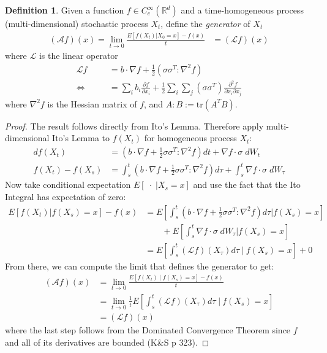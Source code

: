 \documentclass[12pt]{article}
\theoremstyle{plain}
\theoremstyle{definition}
\newtheorem{defn}[thm]{Definition}
\theoremstyle{remark}
\begin{document}
\begin{defn}
Given a function $f\in C_c^\infty(\mathbb{R}^d)$ and a time-homogeneous
process (multi-dimensional) stochastic process $X_t$, define the
\emph{generator} of $X_t$
\begin{align*}
  (\mathscr{A}f)(x)=
  \lim_{t\rightarrow0} \frac{E[f(X_t)|X_0=x]-f(x)}{t}
  &= (\mathscr{L}f)(x)
\end{align*}
where $\mathscr{L}$ is the linear operator
\begin{align*}
  \mathscr{L}f &= b \cdot \nabla f
  + \frac{1}{2} \left(\sigma \sigma^T:\nabla^2 f\right)\\
  \Leftrightarrow \qquad
  &= \sum_i b_i \frac{\partial f}{\partial x_i}
  + \frac{1}{2} \sum_i \sum_j \left(\sigma \sigma^T\right)
    \frac{\partial^2 f}{\partial x_i \partial x_j}
\end{align*}
where $\nabla^2 f$ is the Hessian matrix of $f$, and $A:B :=
\text{tr}(A^T B)$.
\end{defn}
\begin{proof}
The result follows directly from Ito's Lemma. Therefore apply
multi-dimensional Ito's Lemma to $f(X_t)$ for homogeneous process $X_t$:
\begin{align*}
  df(X_t) &=
  \left(b\cdot \nabla f + \frac{1}{2}\sigma\sigma^T : \nabla^2 f\right)
  dt
  + \nabla f\cdot \sigma \;dW_t\\
  f(X_t) - f(X_s) &=
  \int^t_s
  \left(b\cdot \nabla f + \frac{1}{2}\sigma\sigma^T : \nabla^2 f\right)
  d\tau
  +
  \int^t_s
  \nabla f\cdot \sigma \;dW_\tau
\end{align*}
Now take conditional expectation $E[\;\cdot\;|X_s=x]$ and use the fact
that the Ito Integral has expectation of zero:
\begin{align*}
  E[f(X_t)|f(X_s)=x] - f(x) &=
  E\left[
  \int^t_s
  \left(b\cdot \nabla f + \frac{1}{2}\sigma\sigma^T : \nabla^2 f\right)
  d\tau
  |f(X_s)=x\right]\\
  &\qquad
  +
  E\left[
  \int^t_s
  \nabla f\cdot \sigma \;dW_\tau
  |f(X_s)=x\right]
  \\
  &=
  E\left[ \int^t_s (\mathscr{L} f)(X_\tau) d\tau \;\big|\:f(X_s)=x\right] + 0
\end{align*}
From there, we can compute the limit that defines the generator to get:
\begin{align*}
  (\mathscr{A}f)(x)
  &=\lim_{t\rightarrow0} \frac{E[f(X_t)\;|\;f(X_s)=x] - f(x)}{t}\\
  &=\lim_{t\rightarrow0} \frac{1}{t}
  E\left[ \int^t_s (\mathscr{L} f)(X_\tau) d\tau \; \big|\:f(X_s)=x\right]\\
  &=(\mathscr{L}f)(x)
\end{align*}
where the last step follows from the Dominated Convergence Theorem since
$f$ and all of its derivatives are bounded (K\&S p 323).
\end{proof}
\end{document}
